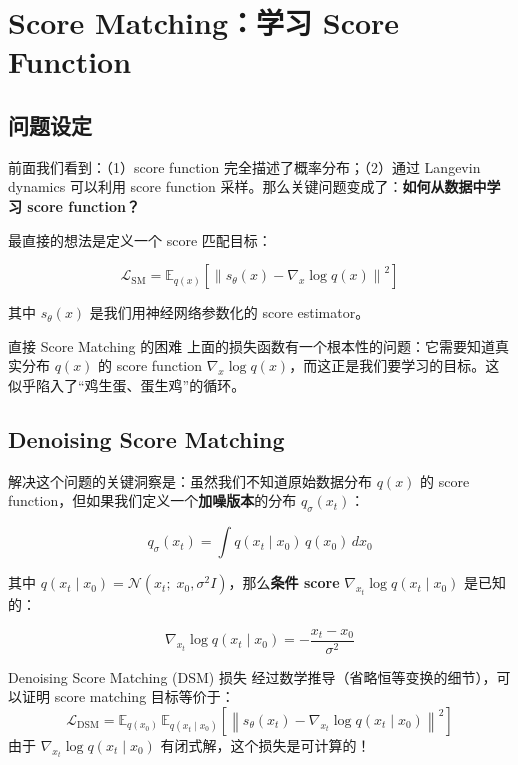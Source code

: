\section{Score Matching：学习 Score Function}

\subsection{问题设定}

前面我们看到：（1）score function 完全描述了概率分布；（2）通过 Langevin dynamics 可以利用 score function 采样。那么关键问题变成了：\textbf{如何从数据中学习 score function？}

最直接的想法是定义一个 score 匹配目标：

$$\mathcal{L}_{\text{SM}} = \mathbb{E}_{q(x)}\left[\left\| s_\theta(x) - \nabla_x \log q(x) \right\|^2\right]$$

其中 $s_\theta(x)$ 是我们用神经网络参数化的 score estimator。

\begin{warningbox}{直接 Score Matching 的困难}
上面的损失函数有一个根本性的问题：它需要知道真实分布 $q(x)$ 的 score function $\nabla_x \log q(x)$，而这正是我们要学习的目标。这似乎陷入了``鸡生蛋、蛋生鸡''的循环。
\end{warningbox}

\subsection{Denoising Score Matching}

解决这个问题的关键洞察是：虽然我们不知道原始数据分布 $q(x)$ 的 score function，但如果我们定义一个\textbf{加噪版本}的分布 $q_\sigma(x_t)$：

$$q_\sigma(x_t) = \int q(x_t \mid x_0)\, q(x_0)\, dx_0$$

其中 $q(x_t \mid x_0) = \mathcal{N}(x_t;\; x_0, \sigma^2 I)$，那么\textbf{条件 score} $\nabla_{x_t} \log q(x_t \mid x_0)$ 是已知的：

$$\nabla_{x_t} \log q(x_t \mid x_0) = -\frac{x_t - x_0}{\sigma^2}$$

\begin{importantbox}{Denoising Score Matching (DSM) 损失}
经过数学推导（省略恒等变换的细节），可以证明 score matching 目标等价于：
$$\mathcal{L}_{\text{DSM}} = \mathbb{E}_{q(x_0)}\, \mathbb{E}_{q(x_t \mid x_0)}\left[\left\| s_\theta(x_t) - \nabla_{x_t} \log q(x_t \mid x_0) \right\|^2\right]$$
由于 $\nabla_{x_t} \log q(x_t \mid x_0)$ 有闭式解，这个损失是可计算的！
\end{importantbox}

